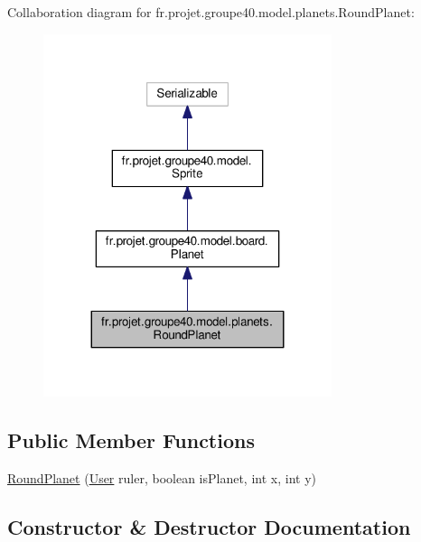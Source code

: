 Collaboration diagram for fr.\+projet.\+groupe40.\+model.\+planets.\+Round\+Planet\+:\nopagebreak
\begin{figure}[H]
\begin{center}
\leavevmode
\includegraphics[width=239pt]{classfr_1_1projet_1_1groupe40_1_1model_1_1planets_1_1_round_planet__coll__graph}
\end{center}
\end{figure}
\subsection*{Public Member Functions}
\begin{DoxyCompactItemize}
\item 
\hyperlink{classfr_1_1projet_1_1groupe40_1_1model_1_1planets_1_1_round_planet_a92efe16cffdc4650d2e8b802897c940b}{Round\+Planet} (\hyperlink{classfr_1_1projet_1_1groupe40_1_1client_1_1_user}{User} ruler, boolean is\+Planet, int x, int y)
\end{DoxyCompactItemize}


\subsection{Constructor \& Destructor Documentation}
\mbox{\label{classfr_1_1projet_1_1groupe40_1_1model_1_1planets_1_1_round_planet_a92efe16cffdc4650d2e8b802897c940b}} 
